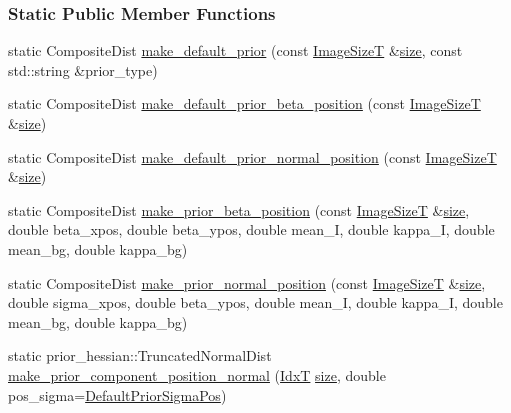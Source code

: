 \subsubsection*{Static Public Member Functions}
\begin{DoxyCompactItemize}
\item 
static Composite\+Dist \hyperlink{classmappel_1_1Gauss2DModel_a47f4b70d887066e1d73c0544e0a9690c}{make\+\_\+default\+\_\+prior} (const \hyperlink{classmappel_1_1ImageFormat2DBase_a49cccf61eb2a768a202634d27fcd81d5}{Image\+SizeT} \&\hyperlink{classmappel_1_1ImageFormat2DBase_a3be77d2aa6ec9f3815322732950c2a60}{size}, const std\+::string \&prior\+\_\+type)
\item 
static Composite\+Dist \hyperlink{classmappel_1_1Gauss2DModel_a47208116565b1960bc0bd84ee91dee1d}{make\+\_\+default\+\_\+prior\+\_\+beta\+\_\+position} (const \hyperlink{classmappel_1_1ImageFormat2DBase_a49cccf61eb2a768a202634d27fcd81d5}{Image\+SizeT} \&\hyperlink{classmappel_1_1ImageFormat2DBase_a3be77d2aa6ec9f3815322732950c2a60}{size})
\item 
static Composite\+Dist \hyperlink{classmappel_1_1Gauss2DModel_a22735422ebc24803eb51f2be72a67009}{make\+\_\+default\+\_\+prior\+\_\+normal\+\_\+position} (const \hyperlink{classmappel_1_1ImageFormat2DBase_a49cccf61eb2a768a202634d27fcd81d5}{Image\+SizeT} \&\hyperlink{classmappel_1_1ImageFormat2DBase_a3be77d2aa6ec9f3815322732950c2a60}{size})
\item 
static Composite\+Dist \hyperlink{classmappel_1_1Gauss2DModel_a78470247a902315915ad8af1770ea466}{make\+\_\+prior\+\_\+beta\+\_\+position} (const \hyperlink{classmappel_1_1ImageFormat2DBase_a49cccf61eb2a768a202634d27fcd81d5}{Image\+SizeT} \&\hyperlink{classmappel_1_1ImageFormat2DBase_a3be77d2aa6ec9f3815322732950c2a60}{size}, double beta\+\_\+xpos, double beta\+\_\+ypos, double mean\+\_\+I, double kappa\+\_\+I, double mean\+\_\+bg, double kappa\+\_\+bg)
\item 
static Composite\+Dist \hyperlink{classmappel_1_1Gauss2DModel_af60537cc3f45472202602e95d1e75f65}{make\+\_\+prior\+\_\+normal\+\_\+position} (const \hyperlink{classmappel_1_1ImageFormat2DBase_a49cccf61eb2a768a202634d27fcd81d5}{Image\+SizeT} \&\hyperlink{classmappel_1_1ImageFormat2DBase_a3be77d2aa6ec9f3815322732950c2a60}{size}, double sigma\+\_\+xpos, double beta\+\_\+ypos, double mean\+\_\+I, double kappa\+\_\+I, double mean\+\_\+bg, double kappa\+\_\+bg)
\item 
static prior\+\_\+hessian\+::\+Truncated\+Normal\+Dist \hyperlink{classmappel_1_1PointEmitterModel_a70b1a5c81d227dce0ffb5910ffbf7387}{make\+\_\+prior\+\_\+component\+\_\+position\+\_\+normal} (\hyperlink{namespacemappel_ab17ec0f30b61ece292439d7ece81d3a8}{IdxT} \hyperlink{classmappel_1_1ImageFormat2DBase_a3be77d2aa6ec9f3815322732950c2a60}{size}, double pos\+\_\+sigma=\hyperlink{classmappel_1_1PointEmitterModel_a38b73a91eaae7b5fd0977b88ea844280}{Default\+Prior\+Sigma\+Pos})

\end{DoxyCompactItemize}
